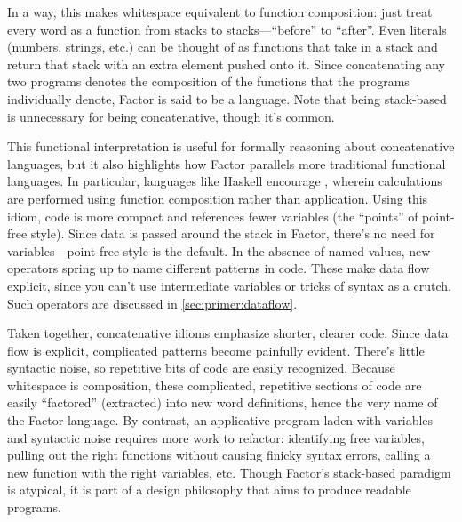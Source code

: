 In a way, this makes whitespace equivalent to function composition: just treat
every word as a function from stacks to stacks---``before'' to ``after''.  Even
literals (numbers, strings, etc.) can be thought of as functions that take in a
stack and return that stack with an extra element pushed onto it.  Since
concatenating any two programs denotes the composition of the functions that
the programs individually denote, Factor is said to be a 
language.  Note that being stack-based is
unnecessary for being concatenative, though it's common.

This functional interpretation is useful for formally reasoning about
concatenative languages, but it also highlights how Factor
parallels more traditional functional languages.  In particular, languages like
Haskell encourage , wherein calculations are performed
using function composition rather than application.  Using this
idiom, code is more compact and references fewer variables (the ``points'' of
point-free style).  Since data is passed around the stack in Factor, there's no
need for variables---point-free style is the default.  In the absence of named
values, new operators spring up to name different patterns in code.  These make
data flow explicit, since you can't use intermediate variables or tricks of
syntax as a crutch.  Such operators are discussed in
\cref{sec:primer:dataflow}.

Taken together, concatenative idioms emphasize shorter, clearer code.  Since
data flow is explicit, complicated patterns become painfully evident.  There's
little syntactic noise, so repetitive bits of code are easily recognized.
Because whitespace is composition, these complicated, repetitive sections of
code are easily ``factored'' (extracted) into new word definitions, hence the
very name of the Factor language.  By contrast, an applicative program laden
with variables and syntactic noise requires more work to refactor: identifying
free variables, pulling out the right functions without causing finicky syntax
errors, calling a new function with the right variables, etc.  Though Factor's
stack-based paradigm is atypical, it is part of a design philosophy that aims
to produce readable programs.

